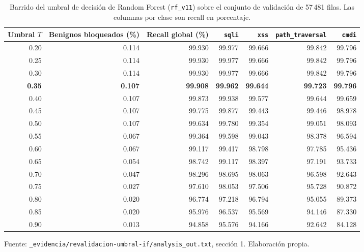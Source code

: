 \begin{table}[htbp]
\centering
\footnotesize
\setlength{\tabcolsep}{3pt}
\begin{adjustbox}{max width=\linewidth}
\begin{tabular}{|r|r|r|r|r|r|r|}
\hline
\textbf{Umbral} $T$ & \textbf{Benignos bloqueados (\%)} & \textbf{Recall global (\%)} & \textbf{\texttt{sqli}} & \textbf{\texttt{xss}} & \textbf{\texttt{path\_traversal}} & \textbf{\texttt{cmdi}} \\ \hline
0.20 & 0.114 & 99.930 & 99.977 & 99.666 & 99.842 & 99.796 \\ \hline
0.25 & 0.114 & 99.930 & 99.977 & 99.666 & 99.842 & 99.796 \\ \hline
0.30 & 0.114 & 99.930 & 99.977 & 99.666 & 99.842 & 99.796 \\ \hline
\textbf{0.35} & \textbf{0.107} & \textbf{99.908} & \textbf{99.962} & \textbf{99.644} & \textbf{99.723} & \textbf{99.796} \\ \hline
0.40 & 0.107 & 99.873 & 99.938 & 99.577 & 99.644 & 99.659 \\ \hline
0.45 & 0.107 & 99.775 & 99.877 & 99.443 & 99.446 & 98.978 \\ \hline
0.50 & 0.107 & 99.634 & 99.780 & 99.354 & 99.051 & 98.093 \\ \hline
0.55 & 0.067 & 99.364 & 99.598 & 99.043 & 98.378 & 96.594 \\ \hline
0.60 & 0.067 & 99.117 & 99.417 & 98.798 & 97.785 & 95.436 \\ \hline
0.65 & 0.054 & 98.742 & 99.117 & 98.397 & 97.191 & 93.733 \\ \hline
0.70 & 0.047 & 98.296 & 98.695 & 98.063 & 96.598 & 92.643 \\ \hline
0.75 & 0.027 & 97.610 & 98.053 & 97.506 & 95.728 & 90.872 \\ \hline
0.80 & 0.020 & 96.774 & 97.218 & 96.794 & 95.055 & 89.373 \\ \hline
0.85 & 0.020 & 95.976 & 96.537 & 95.569 & 94.146 & 87.330 \\ \hline
0.90 & 0.013 & 94.858 & 95.576 & 94.166 & 92.642 & 84.128 \\ \hline
\end{tabular}
\end{adjustbox}
\caption{Barrido del umbral de decisión de Random Forest (\texttt{rf\_v11}) sobre el conjunto de validación de 57\,481 filas. Las columnas por clase son recall en porcentaje.}
\label{tabla:anexo-barrido-rf}
\par\smallskip\footnotesize Fuente: \texttt{\_evidencia/revalidacion-umbral-if/analysis\_out.txt}, sección 1. Elaboración propia.
\end{table}

